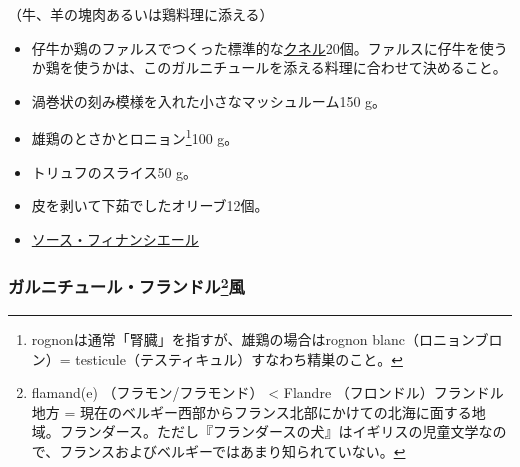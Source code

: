 \begin{recette}

（牛、羊の塊肉あるいは鶏料理に添える）

\begin{itemize}
\item
  仔牛か鶏のファルスでつくった標準的な\protect\hyperlink{quenelles}{クネル}20個。ファルスに仔牛を使うか鶏を使うかは、このガルニチュールを添える料理に合わせて決めること。
\item
  渦巻状の刻み模様を入れた小さなマッシュルーム150 g。
\item
  雄鶏のとさかとロニョン\footnote{rognonは通常「腎臓」を指すが、雄鶏の場合はrognon
    blanc（ロニョンブロン）=
    testicule（テスティキュル）すなわち精巣のこと。}100 g。
\item
  トリュフのスライス50 g。
\item
  皮を剥いて下茹でしたオリーブ12個。
\item
  \protect\hyperlink{sauce-financiere}{ソース・フィナンシエール}
\end{itemize}

\atoaki{}

\hypertarget{garniture-a-la-flamande}{%
\subsubsection[ガルニチュール・フランドル風]{\texorpdfstring{ガルニチュール・フランドル\footnote{flamand(e)
  （フラモン/フラモンド） \textless{} Flandre
  （フロンドル）フランドル地方 =
  現在のベルギー西部からフランス北部にかけての北海に面する地域。フランダース。ただし『フランダースの犬』はイギリスの児童文学なので、フランスおよびベルギーではあまり知られていない。}風}{ガルニチュール・フランドル風}}\label{garniture-a-la-flamande}}




\end{recette}
